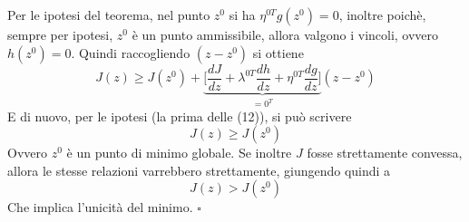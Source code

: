 \documentclass{article}
\begin{document}
Per le ipotesi del teorema, nel punto $z^0$ si ha $\eta^{0T}g(z^0) = 0$, inoltre poichè, sempre per ipotesi, $z^0$ è un punto ammissibile, allora valgono i vincoli, ovvero $h(z^0) = 0$. Quindi raccogliendo $(z-z^0)$ si ottiene
\begin{equation}
    J(z) \geq J(z^0) + \underset{=0^T}{ \underbrace{ \bigg[ \frac{dJ}{dz} + \lambda^{0T} \frac{dh}{dz} + \eta^{0T} \frac{dg}{dz} \bigg] }} (z-z^0) 
\end{equation}
E di nuovo, per le ipotesi (la prima delle (12)), si può scrivere
\begin{equation}
    J(z) \geq J(z^0)
\end{equation}
Ovvero $z^0$ è un punto di minimo globale. Se inoltre $J$ fosse strettamente convessa, allora le stesse relazioni varrebbero strettamente, giungendo quindi a 
\begin{equation}
    J(z) > J(z^0)
\end{equation}
Che implica l'unicità del minimo.
\nobreak 
\hfill
$\square$
\end{document}
